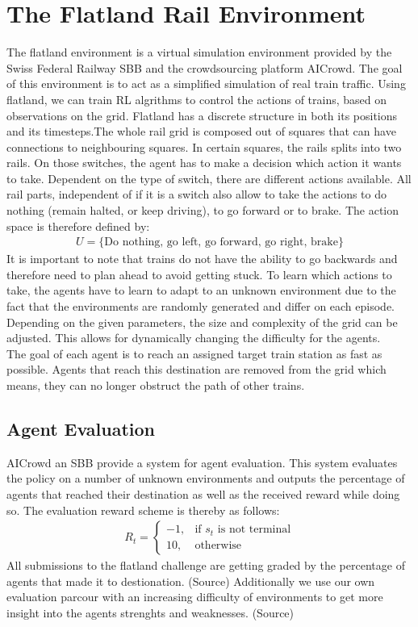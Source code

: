 \section{The Flatland Rail Environment}\label{projektmanagement}
The flatland environment is a virtual simulation environment provided by the Swiss Federal Railway SBB and the crowdsourcing platform AICrowd.
The goal of this environment is to act as a simplified simulation of real train traffic. Using flatland, we can train RL algrithms to control the actions of trains, based on observations on the grid. Flatland has a discrete structure in both its positions and its timesteps.The whole rail grid is composed out of squares that can have connections to neighbouring squares. In certain squares, the rails splits into two rails. On those switches, the agent has to make a decision which action it wants to take. Dependent on the type of switch, there are different actions available. All rail parts, independent of if it is a switch also allow to take the actions to do nothing (remain halted, or keep driving), to go forward or to brake. The action space is therefore defined by:
\begin{gather*}
U = \{ \text{Do nothing, go left, go forward, go right, brake} \}
\end{gather*}
It is important to note that trains do not have the ability to go backwards and therefore need to plan ahead to avoid getting stuck. To learn which actions to take, the agents have to learn to adapt to an unknown environment due to the fact that the environments are randomly generated and differ on each episode. Depending on the given parameters, the size and complexity of the grid can be adjusted. This allows for dynamically changing the difficulty for the agents.\\
The goal of each agent is to reach an assigned target train station as fast as possible. Agents that reach this destination are removed from the grid which means, they can no longer obstruct the path of other trains.
\subsection*{Agent Evaluation}\label{rl_agent_eval}
AICrowd an SBB provide a system for agent evaluation. This system evaluates the policy on a number of unknown environments and outputs the percentage of agents that reached their destination as well as the received reward while doing so. The evaluation reward scheme is thereby as follows:
\begin{gather*}
R_{t}= 
\begin{cases}
-1,				& \text{if } s_{t} \text{ is not terminal}\\
10,             & \text{otherwise}
\end{cases}
\end{gather*}
All submissions to the flatland challenge are getting graded by the percentage of agents that made it to destionation. (Source) Additionally we use our own evaluation parcour with an increasing difficulty of environments to get more insight into the agents strenghts and weaknesses. 
(Source)



